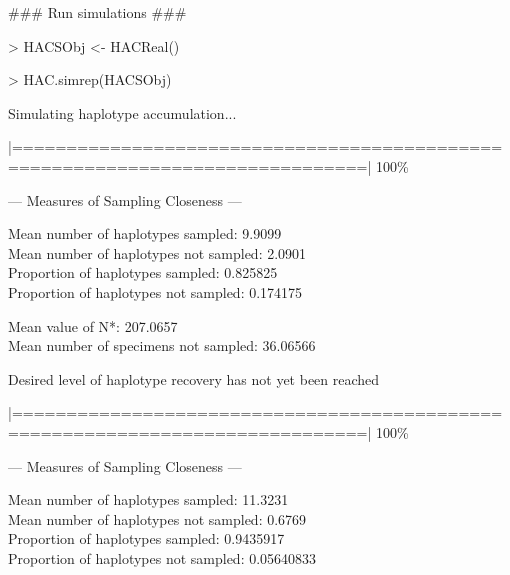 {\tt \scriptsize

{\noindent \#\#\# Run simulations \#\#\#}

\vspace{1mm}

{\noindent > HACSObj <- HACReal()}

\vspace{1mm}

{\noindent > HAC.simrep(HACSObj)} 

\vspace{1mm}

\noindent Simulating haplotype accumulation...

\vspace{2mm}
 
\noindent |==============================================================================| 100\%
  
\vspace{3mm}
 
\noindent --- Measures of Sampling Closeness ---

\vspace{2mm} 
 
\noindent Mean number of haplotypes sampled: 9.9099  \\
Mean number of haplotypes not sampled: 2.0901  \\
Proportion of haplotypes sampled: 0.825825 \\
Proportion of haplotypes not sampled: 0.174175     

\vspace{2mm} 
 
\noindent Mean value of N*: 207.0657  \\
Mean number of specimens not sampled: 36.06566

\vspace{3mm}
 
\noindent Desired level of haplotype recovery has not yet been reached 

\vspace{2mm}

\noindent |==============================================================================| 100\%

\vspace{3mm}

\noindent --- Measures of Sampling Closeness ---

\vspace{2mm} 
 
\noindent Mean number of haplotypes sampled: 11.3231  \\
Mean number of haplotypes not sampled: 0.6769  \\
Proportion of haplotypes sampled: 0.9435917  \\
Proportion of haplotypes not sampled: 0.05640833      

}
